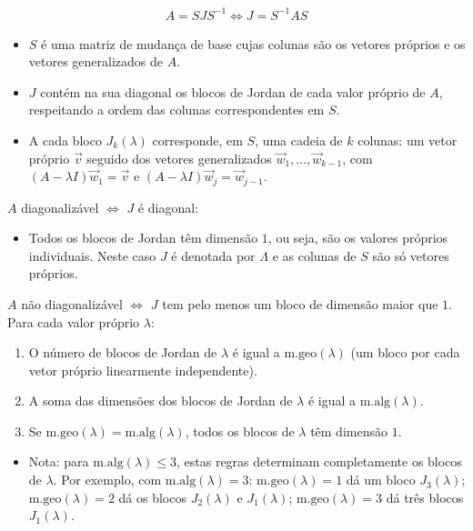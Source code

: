 \documentclass{article}
\begin{document}
\begin{gather*}
\boxed{A = S J S^{-1} \Leftrightarrow J = S^{-1} A S}
\end{gather*}

\begin{itemize}
    \item $S$ é uma matriz de mudança de base cujas colunas são os vetores próprios e os vetores generalizados
    de $A$.
    \item $J$ contém na sua diagonal os blocos de Jordan de cada valor próprio de $A$, respeitando a ordem das
    colunas correspondentes em $S$.
    \item A cada bloco $J_k(\lambda)$ corresponde, em $S$, uma cadeia de $k$ colunas: um vetor próprio
    $\vec{v}$ seguido dos vetores generalizados $\vec{w}_1, \ldots, \vec{w}_{k-1}$, com
    $(A - \lambda I)\vec{w}_1 = \vec{v}$ e $(A - \lambda I)\vec{w}_j = \vec{w}_{j-1}$.
\end{itemize}

\smallskip

$A$ diagonalizável $\iff$ $J$ é diagonal:

\begin{itemize}
    \item Todos os blocos de Jordan têm dimensão $1$, ou seja, são os valores próprios individuais.
    Neste caso $J$ é denotada por $\Lambda$ e as colunas de $S$ são só vetores próprios.
\end{itemize}

$A$ não diagonalizável $\iff$ $J$ tem pelo menos um bloco de dimensão maior que $1$. Para cada valor
próprio $\lambda$:

\begin{enumerate}
    \item O número de blocos de Jordan de $\lambda$ é igual a $\text{m.geo}(\lambda)$ (um bloco por
    cada vetor próprio linearmente independente).
    \item A soma das dimensões dos blocos de Jordan de $\lambda$ é igual a $\text{m.alg}(\lambda)$.
    \item Se $\text{m.geo}(\lambda) = \text{m.alg}(\lambda)$, todos os blocos de $\lambda$ têm
    dimensão $1$.
\end{enumerate}

\begin{itemize}
    \item Nota: para $\text{m.alg}(\lambda) \leq 3$, estas regras determinam completamente os blocos
    de $\lambda$. Por exemplo, com $\text{m.alg}(\lambda) = 3$: $\text{m.geo}(\lambda) = 1$
    dá um bloco $J_3(\lambda)$; $\text{m.geo}(\lambda) = 2$ dá os blocos $J_2(\lambda)$ e
    $J_1(\lambda)$; $\text{m.geo}(\lambda) = 3$ dá três blocos $J_1(\lambda)$.
\end{itemize}
\end{document}
